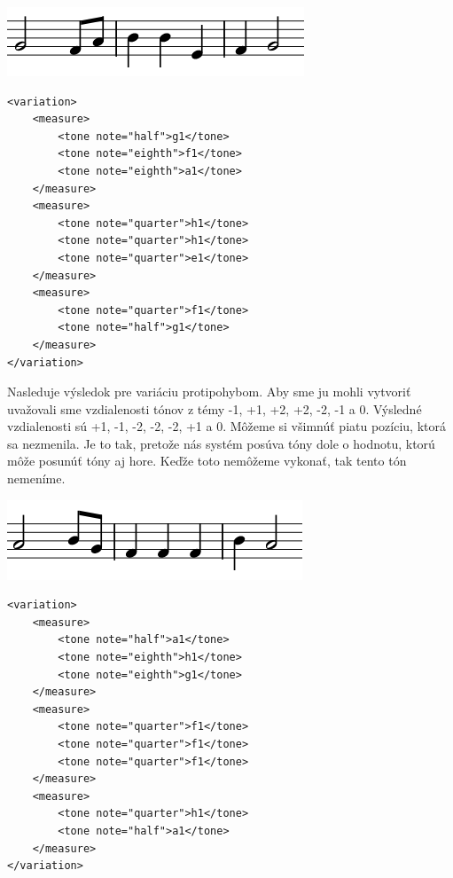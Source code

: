 \begin{minipage}{.45\textwidth}
\includegraphics[width=\textwidth]{thesis/obrazky-figures/var4.png}
\end{minipage}%
\begin{minipage}{.5\textwidth}
\centering
\lstset{language=XML}
\begin{lstlisting}[basicstyle=\tiny]
<variation>
    <measure>
        <tone note="half">g1</tone>
        <tone note="eighth">f1</tone>
        <tone note="eighth">a1</tone>
    </measure>
    <measure>
        <tone note="quarter">h1</tone>
        <tone note="quarter">h1</tone>
        <tone note="quarter">e1</tone>
    </measure>
    <measure>
        <tone note="quarter">f1</tone>
        <tone note="half">g1</tone>
    </measure>
</variation>
\end{lstlisting}
\end{minipage}

Nasleduje výsledok pre variáciu protipohybom. Aby sme ju mohli vytvoriť uvažovali sme vzdialenosti tónov z témy -1, +1, +2, +2, -2, -1 a 0. Výsledné vzdialenosti sú +1, -1, -2, -2, -2, +1 a 0. Môžeme si všimnúť piatu pozíciu, ktorá sa nezmenila. Je to tak, pretože nás systém posúva tóny dole o hodnotu, ktorú môže posunúť tóny aj hore. Keďže toto nemôžeme vykonať, tak tento tón nemeníme.

\begin{minipage}{.45\textwidth}
\includegraphics[width=\textwidth]{thesis/obrazky-figures/var5.png}
\end{minipage}%
\begin{minipage}{.5\textwidth}
\centering
\lstset{language=XML}
\begin{lstlisting}[basicstyle=\tiny]
<variation>
    <measure>
        <tone note="half">a1</tone>
        <tone note="eighth">h1</tone>
        <tone note="eighth">g1</tone>
    </measure>
    <measure>
        <tone note="quarter">f1</tone>
        <tone note="quarter">f1</tone>
        <tone note="quarter">f1</tone>
    </measure>
    <measure>
        <tone note="quarter">h1</tone>
        <tone note="half">a1</tone>
    </measure>
</variation>
\end{lstlisting}
\end{minipage}

